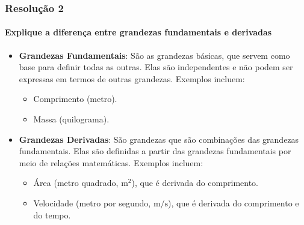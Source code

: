 \documentclass[12pt]{beamer}
\begin{document}
\begin{frame}
\frametitle{Resolução 2}
\framesubtitle{Explique a diferença entre grandezas fundamentais e derivadas}

\begin{itemize}
    \item \textbf{Grandezas Fundamentais}:
    São as grandezas básicas, que servem como base para definir todas as outras. Elas são independentes e não podem ser expressas em termos de outras grandezas. Exemplos incluem:
    \begin{itemize}
        \item Comprimento (metro).
        \item Massa (quilograma).
    \end{itemize}

    \item \textbf{Grandezas Derivadas}:
    São grandezas que são combinações das grandezas fundamentais. Elas são definidas a partir das grandezas fundamentais por meio de relações matemáticas. Exemplos incluem:
    \begin{itemize}
        \item Área (metro quadrado, \( \text{m}^2 \)), que é derivada do comprimento.
        \item Velocidade (metro por segundo, \( \text{m/s} \)), que é derivada do comprimento e do tempo.
    \end{itemize}
\end{itemize}
\end{frame}
\end{document}
